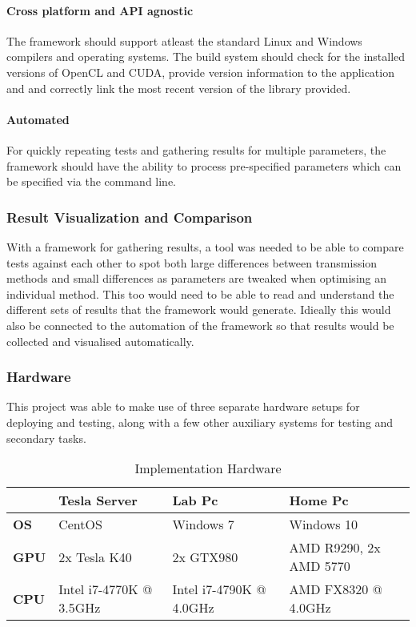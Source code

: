 \documentclass[12pt,a4paper]{article}
\begin{document}
\paragraph{Cross platform and API agnostic}
The framework should support atleast the standard Linux and Windows compilers and operating systems.  The build system should check for the installed versions of OpenCL and CUDA, provide version information to the application and and correctly link the most recent version of the library provided.
\paragraph{Automated}
For quickly repeating tests and gathering results for multiple parameters, the framework should have the ability to process pre-specified parameters which can be specified via the command line.
\subsubsection{Result Visualization and Comparison}
With a framework for gathering results, a tool was needed to be able to compare tests against each other to spot both large differences between transmission methods and small differences as parameters are tweaked when optimising an individual method. This too would need to be able to read and understand the different sets of results that the framework would generate. Idieally this would also be connected to the automation of the framework so that results would be collected and visualised automatically.

\subsubsection{Hardware}
This project was able to make use of three separate hardware setups for deploying and testing, along with a few other auxiliary systems for testing and secondary tasks.

\begin{table*}[h]\centering
\begin{tabular}{p{0.8cm}lll}\toprule
 & Tesla Server & Lab Pc & Home Pc \\ \midrule
\textbf{OS} & CentOS & Windows 7 & Windows 10\\
\textbf{GPU} & 2x Tesla K40 & 2x GTX980 & AMD R9290, 2x AMD 5770\\
\textbf{CPU} & Intel i7-4770K @ 3.5GHz & Intel i7-4790K @ 4.0GHz & AMD FX8320 @ 4.0GHz \\
\bottomrule
	\end{tabular}
	\caption{Implementation Hardware}
\end{table*}
\end{document}
